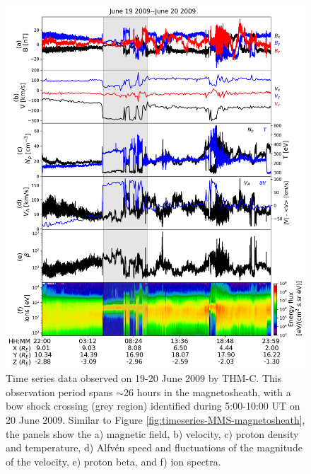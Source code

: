 \begin{figure}
    \centering
    \includegraphics[width=\textwidth]{Figures/Time series/timeseries_19062009_THMC.png}
    \caption[Time series observed in the magnetosheath during 19-20 June 2009]{Time series data observed on 19-20 June 2009 by THM-C. This observation period spans $\sim$26 hours in the magnetosheath, with a bow shock crossing (grey region) identified during 5:00-10:00 UT on 20 June 2009. Similar to Figure \ref{fig:timeseries-MMS-magnetosheath}, the panels show the a) magnetic field, b) velocity, c) proton density and temperature, d) Alfv\'en speed and fluctuations of the magnitude of the velocity, e) proton beta, and f) ion spectra.}
    \label{fig:timeseries-THM-magnetosheath}
\end{figure}

